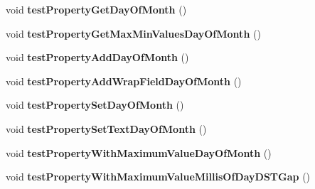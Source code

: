 \begin{DoxyCompactItemize}
\item 
\hypertarget{classorg_1_1joda_1_1time_1_1_test_date_time___properties_a17b7156980db5257cc88f9a003a351a3}{void {\bfseries test\-Property\-Get\-Day\-Of\-Month} ()}\label{classorg_1_1joda_1_1time_1_1_test_date_time___properties_a17b7156980db5257cc88f9a003a351a3}

\item 
\hypertarget{classorg_1_1joda_1_1time_1_1_test_date_time___properties_abed0fe2474e73852ab5b743884ed2cb4}{void {\bfseries test\-Property\-Get\-Max\-Min\-Values\-Day\-Of\-Month} ()}\label{classorg_1_1joda_1_1time_1_1_test_date_time___properties_abed0fe2474e73852ab5b743884ed2cb4}

\item 
\hypertarget{classorg_1_1joda_1_1time_1_1_test_date_time___properties_a56e1f66b987056272869c386c39d50e3}{void {\bfseries test\-Property\-Add\-Day\-Of\-Month} ()}\label{classorg_1_1joda_1_1time_1_1_test_date_time___properties_a56e1f66b987056272869c386c39d50e3}

\item 
\hypertarget{classorg_1_1joda_1_1time_1_1_test_date_time___properties_ab5c1ee941104e68e580a80ccb7a3292a}{void {\bfseries test\-Property\-Add\-Wrap\-Field\-Day\-Of\-Month} ()}\label{classorg_1_1joda_1_1time_1_1_test_date_time___properties_ab5c1ee941104e68e580a80ccb7a3292a}

\item 
\hypertarget{classorg_1_1joda_1_1time_1_1_test_date_time___properties_a32257eac9bf6a8c4ed7824ffa1716b24}{void {\bfseries test\-Property\-Set\-Day\-Of\-Month} ()}\label{classorg_1_1joda_1_1time_1_1_test_date_time___properties_a32257eac9bf6a8c4ed7824ffa1716b24}

\item 
\hypertarget{classorg_1_1joda_1_1time_1_1_test_date_time___properties_a2ab6b31b2820f37ec536d7d8227b36f6}{void {\bfseries test\-Property\-Set\-Text\-Day\-Of\-Month} ()}\label{classorg_1_1joda_1_1time_1_1_test_date_time___properties_a2ab6b31b2820f37ec536d7d8227b36f6}

\item 
\hypertarget{classorg_1_1joda_1_1time_1_1_test_date_time___properties_a6382658ad036d6eabec087bce51e2552}{void {\bfseries test\-Property\-With\-Maximum\-Value\-Day\-Of\-Month} ()}\label{classorg_1_1joda_1_1time_1_1_test_date_time___properties_a6382658ad036d6eabec087bce51e2552}

\item 
\hypertarget{classorg_1_1joda_1_1time_1_1_test_date_time___properties_aecadfc0502cb611c25e86d6b20f75600}{void {\bfseries test\-Property\-With\-Maximum\-Value\-Millis\-Of\-Day\-D\-S\-T\-Gap} ()}\label{classorg_1_1joda_1_1time_1_1_test_date_time___properties_aecadfc0502cb611c25e86d6b20f75600}


\end{DoxyCompactItemize}
